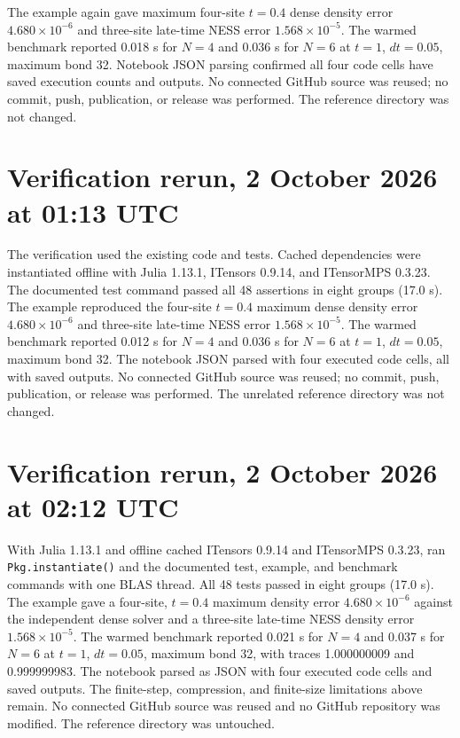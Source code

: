\documentclass[11pt]{article}
\begin{document}
The example again gave maximum four-site $t=0.4$ dense density error
$4.680\times10^{-6}$ and three-site late-time NESS error
$1.568\times10^{-5}$. The warmed benchmark reported 0.018 s for $N=4$
and 0.036 s for $N=6$ at $t=1$, $dt=0.05$, maximum bond 32. Notebook
JSON parsing confirmed all four code cells have saved execution counts
and outputs. No connected GitHub source was reused; no commit, push,
publication, or release was performed. The reference directory was not
changed.
\section*{Verification rerun, 2 October 2026 at 01:13 UTC}
The verification used the existing code and tests. Cached dependencies were instantiated
offline with Julia 1.13.1, ITensors 0.9.14, and ITensorMPS 0.3.23. The
documented test command passed all 48 assertions in eight groups (17.0 s).
The example reproduced the four-site $t=0.4$ maximum dense density error
$4.680\times10^{-6}$ and three-site late-time NESS error
$1.568\times10^{-5}$. The warmed benchmark reported 0.012 s for $N=4$
and 0.036 s for $N=6$ at $t=1$, $dt=0.05$, maximum bond 32. The notebook
JSON parsed with four executed code cells, all with saved outputs. No
connected GitHub source was reused; no commit, push, publication, or
release was performed. The unrelated reference directory was not changed.
\section*{Verification rerun, 2 October 2026 at 02:12 UTC}
With Julia 1.13.1 and
offline cached ITensors 0.9.14 and ITensorMPS 0.3.23, ran
\texttt{Pkg.instantiate()} and the documented test, example, and
benchmark commands with one BLAS thread. All 48 tests passed in eight
groups (17.0 s). The example gave a four-site, $t=0.4$ maximum density
error $4.680\times10^{-6}$ against the independent dense solver and a
three-site late-time NESS density error $1.568\times10^{-5}$. The warmed
benchmark reported 0.021 s for $N=4$ and 0.037 s for $N=6$ at $t=1$,
$dt=0.05$, maximum bond 32, with traces 1.000000009 and 0.999999983.
The notebook parsed as JSON with four executed code cells and saved
outputs. The finite-step, compression, and finite-size limitations above
remain. No connected GitHub source was reused and no GitHub repository
was modified. The reference directory was untouched.
\end{document}
